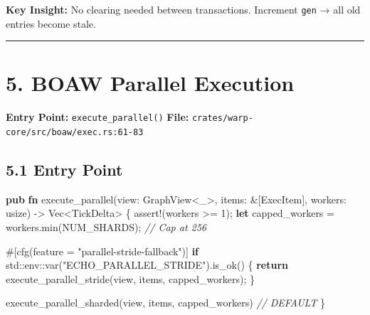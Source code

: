 \documentclass[
]{book}
\newenvironment{Shaded}{}{}
\newcommand{\AttributeTok}[1]{\textcolor[rgb]{0.49,0.56,0.16}{#1}}
\newcommand{\CommentTok}[1]{\textcolor[rgb]{0.38,0.63,0.69}{\textit{#1}}}
\newcommand{\ControlFlowTok}[1]{\textcolor[rgb]{0.00,0.44,0.13}{\textbf{#1}}}
\newcommand{\DataTypeTok}[1]{\textcolor[rgb]{0.56,0.13,0.00}{#1}}
\newcommand{\DecValTok}[1]{\textcolor[rgb]{0.25,0.63,0.44}{#1}}
\newcommand{\KeywordTok}[1]{\textcolor[rgb]{0.00,0.44,0.13}{\textbf{#1}}}
\newcommand{\NormalTok}[1]{#1}
\newcommand{\OperatorTok}[1]{\textcolor[rgb]{0.40,0.40,0.40}{#1}}
\newcommand{\OtherTok}[1]{\textcolor[rgb]{0.00,0.44,0.13}{#1}}
\newcommand{\PreprocessorTok}[1]{\textcolor[rgb]{0.74,0.48,0.00}{#1}}
\newcommand{\StringTok}[1]{\textcolor[rgb]{0.25,0.44,0.63}{#1}}
\begin{document}
\textbf{Key Insight:} No clearing needed between transactions. Increment
\texttt{gen} → all old entries become stale.

\begin{center}\rule{0.5\linewidth}{0.5pt}\end{center}

\section{5. BOAW Parallel Execution}\label{boaw-parallel-execution}

\textbf{Entry Point:} \texttt{execute\_parallel()} \textbf{File:}
\texttt{crates/warp-core/src/boaw/exec.rs:61-83}

\subsection{5.1 Entry Point}\label{entry-point}

\begin{Shaded}
\begin{Highlighting}[]
\KeywordTok{pub} \KeywordTok{fn}\NormalTok{ execute\_parallel(view}\OperatorTok{:}\NormalTok{ GraphView}\OperatorTok{\textless{}}\OtherTok{\textquotesingle{}\_}\OperatorTok{\textgreater{},}\NormalTok{ items}\OperatorTok{:} \OperatorTok{\&}\NormalTok{[ExecItem]}\OperatorTok{,}\NormalTok{ workers}\OperatorTok{:} \DataTypeTok{usize}\NormalTok{) }\OperatorTok{{-}\textgreater{}} \DataTypeTok{Vec}\OperatorTok{\textless{}}\NormalTok{TickDelta}\OperatorTok{\textgreater{}} \OperatorTok{\{}
    \PreprocessorTok{assert!}\NormalTok{(workers }\OperatorTok{\textgreater{}=} \DecValTok{1}\NormalTok{)}\OperatorTok{;}
    \KeywordTok{let}\NormalTok{ capped\_workers }\OperatorTok{=}\NormalTok{ workers}\OperatorTok{.}\NormalTok{min(NUM\_SHARDS)}\OperatorTok{;}  \CommentTok{// Cap at 256}

    \AttributeTok{\#[}\NormalTok{cfg}\AttributeTok{(}\NormalTok{feature }\OperatorTok{=} \StringTok{"parallel{-}stride{-}fallback"}\AttributeTok{)]}
    \ControlFlowTok{if} \PreprocessorTok{std::env::}\NormalTok{var(}\StringTok{"ECHO\_PARALLEL\_STRIDE"}\NormalTok{)}\OperatorTok{.}\NormalTok{is\_ok() }\OperatorTok{\{}
        \ControlFlowTok{return}\NormalTok{ execute\_parallel\_stride(view}\OperatorTok{,}\NormalTok{ items}\OperatorTok{,}\NormalTok{ capped\_workers)}\OperatorTok{;}
    \OperatorTok{\}}

\NormalTok{    execute\_parallel\_sharded(view}\OperatorTok{,}\NormalTok{ items}\OperatorTok{,}\NormalTok{ capped\_workers)  }\CommentTok{// DEFAULT}
\OperatorTok{\}}
\end{Highlighting}
\end{Shaded}
\end{document}
